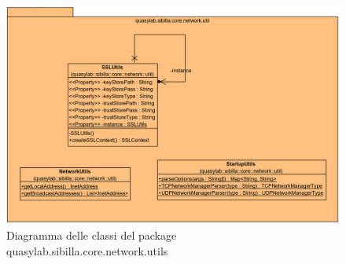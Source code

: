 \begin{figure}[H]
    \includegraphics[width=\linewidth]{images/quasylab.sibilla.core.network.utils.png}
    \captionsetup{justification=centering}
    \caption{Diagramma delle classi del package quasylab.sibilla.core.network.utils}
  \end{figure}













